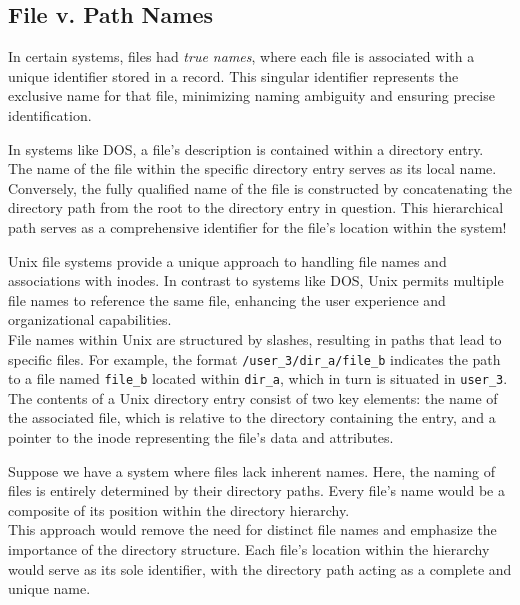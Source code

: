 \documentclass{report}
\newcommand{\exampleBegin}[1]{\begin{tcolorbox}[colback=blue!5!white,colframe=black!75!blue,title={Example:
      #1}]}
\newcommand{\exampleEnd}{\end{tcolorbox}}
\newcommand{\asideBegin}[1]{\begin{tcolorbox}[colback=orange!5!white,colframe=black!75!orange,title={Aside:
      #1}]}
\newcommand{\asideEnd}{\end{tcolorbox}}
\begin{document}
\subsection{File v. Path Names}
In certain systems, files had \textit{true names}, where each file is associated with a unique identifier
stored in a record. This singular identifier represents the exclusive name for that file, minimizing
naming ambiguity and ensuring precise identification.

\exampleBegin{DOS}
In systems like DOS, a file's description is contained within a directory entry. The name of the
file within the specific directory entry serves as its local name. Conversely, the fully qualified
name of the file is constructed by concatenating the directory path from the root to the directory
entry in question. This hierarchical path serves as a comprehensive identifier for the file's
location within the system!
\exampleEnd

\exampleBegin{Unix}
Unix file systems provide a unique approach to handling file names and associations with inodes. In
contrast to systems like DOS, Unix permits multiple file names to reference the same file, enhancing
the user experience and organizational capabilities. \\

File names within Unix are structured by slashes, resulting in paths that lead to specific
files. For example, the format \texttt{/user\_3/dir\_a/file\_b} indicates the path to a file named
\texttt{file\_b} located within \texttt{dir\_a}, which in turn is situated in \texttt{user\_3}. \\

The contents of a Unix directory entry consist of two key elements: the name of the associated file,
which is relative to the directory containing the entry, and a pointer to the inode representing the
file's data and attributes.
\exampleEnd

\asideBegin{Path Names as Sole Identifiers}
Suppose we have a system where files lack inherent names. Here, the naming of files is entirely
determined by their directory paths. Every file's name would be a composite of its position within
the directory hierarchy. \\

This approach would remove the need for distinct file names and emphasize the importance of the
directory structure. Each file's location within the hierarchy would serve as its sole identifier,
with the directory path acting as a complete and unique name.
\asideEnd
\end{document}
